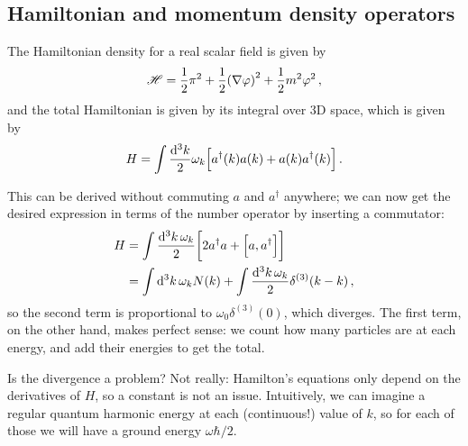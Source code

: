 \documentclass[main.tex]{subfiles}
\begin{document}
\subsection{Hamiltonian and momentum density operators}

The Hamiltonian density for a real scalar field is given by 
%
\begin{align}
\mathscr{H} = \frac{1}{2} \pi^2 + \frac{1}{2} \qty(\nabla \varphi )^2 + \frac{1}{2} m^2\varphi^2
\,,
\end{align}
%
and the total Hamiltonian is given by its integral over 3D space, which is given by 
%
\begin{align}
H = \int \frac{ \dd[3]{k}}{2} \omega_{k} \qty[ a ^\dag (k) a(k) + a(k) a ^\dag (k)]
\,.
\end{align}

This can be derived without commuting \(a\) and \(a ^\dag\) anywhere; we can now get the desired expression in terms of the number operator by inserting a commutator: 
%
\begin{align}
H &= \int \frac{ \dd[3]{k} \omega_{k} }{2} \qty[2 a ^\dag a + \qty[a, a ^\dag]]   \\
&= \int \dd[3]{k} \omega_{k} N(k) + \int \frac{ \dd[3]{k} \omega_{k}}{2} \delta^{(3)} (k - k)
\,,
\end{align}
%
so the second term is proportional to \(\omega_{0} \delta^{(3)} (0)\), which diverges. 
The first term, on the other hand, makes perfect sense: we count how many particles are at each energy, and add their energies to get the total. 

Is the divergence a problem? Not really: Hamilton's equations only depend on the derivatives of \(H\), so a constant is not an issue. 
Intuitively, we can imagine a regular quantum harmonic energy at each (continuous!) value of \(k\), so for each of those we will have a ground energy \( \omega \hbar /2\). 
\end{document}
